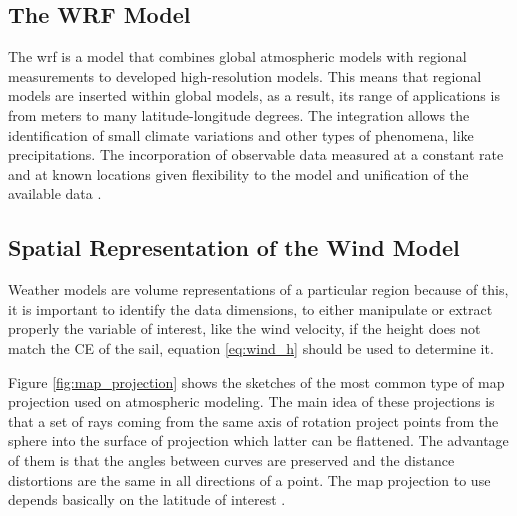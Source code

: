 \subsection{The WRF Model }
The \acrshort{wrf} is a model that combines global atmospheric models with regional measurements to developed high-resolution models. This means that regional models are inserted within global models, as a result, its range of applications is from meters to many latitude-longitude degrees. The integration allows the identification of small climate variations and other types of phenomena, like precipitations. The incorporation of observable data measured at a constant rate and at known locations given flexibility to the model and unification of the available data \cite{warner2010numerical}. \par

\subsection{Spatial Representation of the Wind Model}

Weather models are volume representations of a particular region because of this, it is important to identify the data dimensions, to either manipulate or extract properly the variable of interest, like the wind velocity, if the height does not match the CE of the sail, equation \ref{eq:wind_h} should be used to determine it. \par \noindent %
Figure \ref{fig:map_projection} shows the sketches of the most common type of map projection used on atmospheric modeling. The main idea of these projections is that a set of rays coming from the same axis of rotation project points from the sphere into the surface of projection which latter can be flattened. %
The advantage of them %
is that the angles between curves are preserved and the distance distortions are the same in all directions of a point. The map projection to use depends basically %
on the latitude of interest \cite{warner2010numerical}. \par


